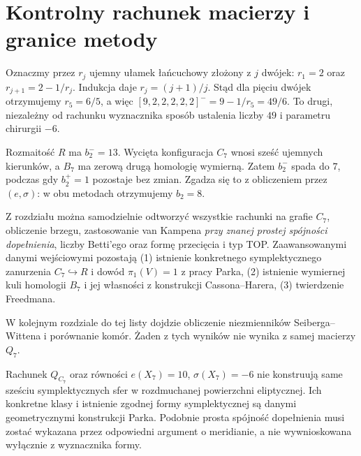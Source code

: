 \section{Kontrolny rachunek macierzy i granice metody}
\label{sec:tg-park-summary}

\begin{przyklad}
Oznaczmy przez $r_j$ ujemny ułamek łańcuchowy
złożony z $j$ dwójek: $r_1=2$ oraz
$r_{j+1}=2-1/r_j$. Indukcja daje
$r_j=(j+1)/j$. Stąd dla pięciu dwójek
otrzymujemy $r_5=6/5$, a więc
$[9,2,2,2,2,2]^-=9-1/r_5=49/6$.
To drugi, niezależny od rachunku wyznacznika sposób
ustalenia liczby $49$ i parametru chirurgii $-6$.
\end{przyklad}

\begin{przyklad}
Rozmaitość $R$ ma $b_2^-=13$. Wycięta konfiguracja
$C_7$ wnosi sześć ujemnych kierunków, a $B_7$ ma
zerową drugą homologię wymierną. Zatem $b_2^-$
spada do $7$, podczas gdy $b_2^+=1$ pozostaje
bez zmian. Zgadza się to z obliczeniem przez
$(e,\sigma)$: w obu metodach otrzymujemy $b_2=8$.
\end{przyklad}

\begin{uwaga}
Z rozdziału można samodzielnie odtworzyć wszystkie
rachunki na grafie $C_7$, obliczenie brzegu, zastosowanie
van Kampena \emph{przy znanej prostej spójności dopełnienia},
liczby Betti'ego oraz formę przecięcia i typ TOP.
Zaawansowanymi danymi wejściowymi pozostają
(1) istnienie konkretnego symplektycznego zanurzenia
$C_7\hookrightarrow R$ i dowód $\pi_1(V)=1$ z pracy Parka,
(2) istnienie wymiernej kuli homologii $B_7$ i jej
własności z konstrukcji Cassona--Harera,
(3) twierdzenie Freedmana.

W kolejnym rozdziale do tej listy dojdzie obliczenie
niezmienników Seiberga--Wittena i porównanie komór.
Żaden z tych wyników nie wynika z samej macierzy $Q_7$.
\end{uwaga}


\begin{uwaga}
Rachunek $Q_{C_7}$ oraz równości
$e(X_7)=10$, $\sigma(X_7)=-6$ nie konstruują same
sześciu symplektycznych sfer w rozdmuchanej powierzchni
eliptycznej. Ich konkretne klasy i istnienie zgodnej
formy symplektycznej są danymi geometrycznymi konstrukcji
Parka. Podobnie prosta spójność dopełnienia musi zostać
wykazana przez odpowiedni argument o meridianie,
a nie wywnioskowana wyłącznie z wyznacznika formy.
\end{uwaga}

